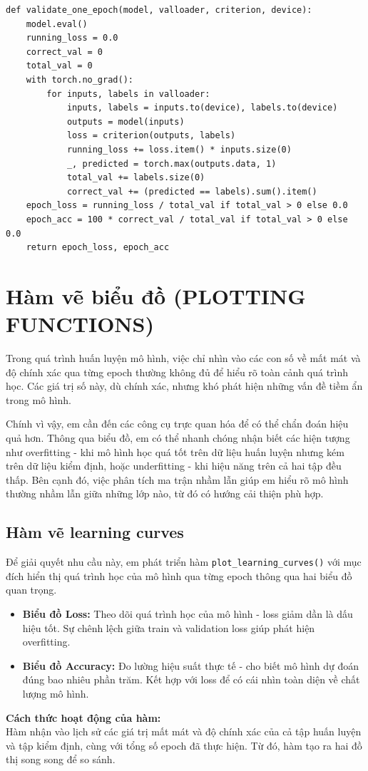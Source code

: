 \documentclass[12pt, a4paper, openany]{report}
\begin{document}
\begin{verbatim}
def validate_one_epoch(model, valloader, criterion, device):
    model.eval()
    running_loss = 0.0
    correct_val = 0
    total_val = 0
    with torch.no_grad():
        for inputs, labels in valloader:
            inputs, labels = inputs.to(device), labels.to(device)
            outputs = model(inputs)
            loss = criterion(outputs, labels)
            running_loss += loss.item() * inputs.size(0)
            _, predicted = torch.max(outputs.data, 1)
            total_val += labels.size(0)
            correct_val += (predicted == labels).sum().item()
    epoch_loss = running_loss / total_val if total_val > 0 else 0.0
    epoch_acc = 100 * correct_val / total_val if total_val > 0 else 0.0
    return epoch_loss, epoch_acc
\end{verbatim}

\section{Hàm vẽ biểu đồ (PLOTTING FUNCTIONS)}
Trong quá trình huấn luyện mô hình, việc chỉ nhìn vào các con số về mất mát và độ chính xác qua từng epoch thường không đủ để hiểu rõ toàn cảnh quá trình học. Các giá trị số này, dù chính xác, nhưng khó phát hiện những vấn đề tiềm ẩn trong mô hình. 

Chính vì vậy, em cần đến các công cụ trực quan hóa để có thể chẩn đoán hiệu quả hơn. Thông qua biểu đồ, em có thể nhanh chóng nhận biết các hiện tượng như overfitting - khi mô hình học quá tốt trên dữ liệu huấn luyện nhưng kém trên dữ liệu kiểm định, hoặc underfitting - khi hiệu năng trên cả hai tập đều thấp. Bên cạnh đó, việc phân tích ma trận nhầm lẫn giúp em hiểu rõ mô hình thường nhầm lẫn giữa những lớp nào, từ đó có hướng cải thiện phù hợp.

\subsection{Hàm vẽ learning curves}
Để giải quyết nhu cầu này, em phát triển hàm \texttt{plot\_learning\_curves()} với mục đích hiển thị quá trình học của mô hình qua từng epoch thông qua hai biểu đồ quan trọng.
\begin{itemize}
    \item \textbf{Biểu đồ Loss:} Theo dõi quá trình học của mô hình - loss giảm dần là dấu hiệu tốt. Sự chênh lệch giữa train và validation loss giúp phát hiện overfitting.
    \item \textbf{Biểu đồ Accuracy:} Đo lường hiệu suất thực tế - cho biết mô hình dự đoán đúng bao nhiêu phần trăm. Kết hợp với loss để có cái nhìn toàn diện về chất lượng mô hình.
\end{itemize}
\textbf{Cách thức hoạt động của hàm:} \\
Hàm nhận vào lịch sử các giá trị mất mát và độ chính xác của cả tập huấn luyện và tập kiểm định, cùng với tổng số epoch đã thực hiện. Từ đó, hàm tạo ra hai đồ thị song song để so sánh. 
\end{document}
